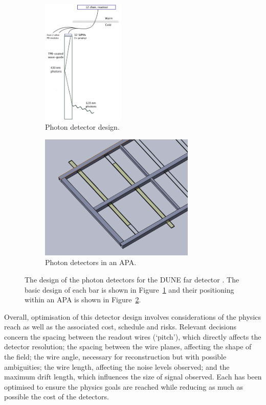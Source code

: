 \begin{figure}
  \centering
  \begin{subfigure}[t]{0.48\linewidth}
    \centering
    \includegraphics[height=6cm]{DUNEPhotonDetectors.png}
    \caption{Photon detector design.}
    \label{fig:DUNEPhotonDetectorsBar}
  \end{subfigure}
  \hfill
  \begin{subfigure}[t]{0.48\linewidth}
    \centering
    \includegraphics[height=6cm]{DUNEPhotonDetectorsAPA.png}
    \caption{Photon detectors in an APA.}
    \label{fig:DUNEPhotonDetectorsAPA}
  \end{subfigure}
  \caption[The design of the photon detectors for the DUNE far detector.]{The design of the photon detectors for the DUNE far detector \cite{DUNECDR4}.  The basic design of each bar is shown in Figure~\ref{fig:DUNEPhotonDetectorsBar} and their positioning within an APA is shown in Figure~\ref{fig:DUNEPhotonDetectorsAPA}.}
  \label{fig:DUNEPhotonDetectors}
\end{figure}

Overall, optimisation of this detector design involves considerations of the physics reach as well as the associated cost, schedule and risks.  Relevant decisions concern the spacing between the readout wires (`pitch'), which directly affects the detector resolution; the spacing between the wire planes, affecting the shape of the field; the wire angle, necessary for reconstruction but with possible ambiguities; the wire length, affecting the noise levels observed; and the maximum drift length, which influences the size of signal observed.  Each has been optimised to ensure the physics goals are reached while reducing as much as possible the cost of the detectors.

